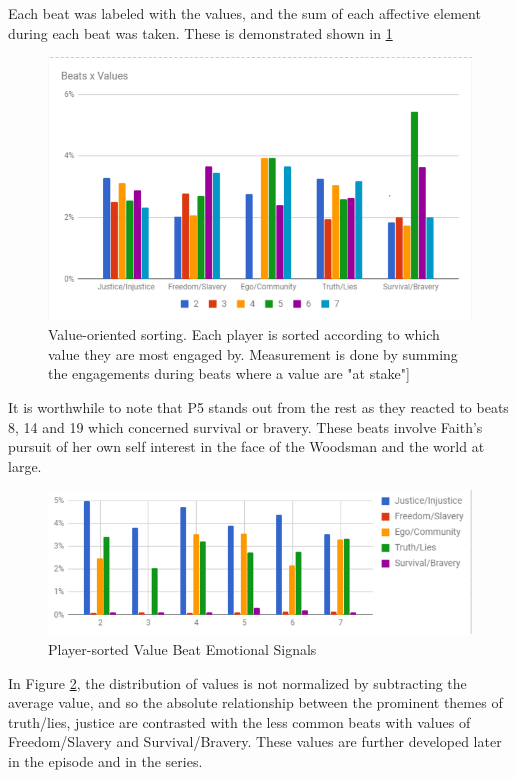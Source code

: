 Each beat was labeled with the values, and the sum of each affective
element during each beat was taken. These is demonstrated shown in
\ref{fig:org6c0ff0b}

\begin{figure}[htbp]
\centering
\includegraphics[width=.9\linewidth]{figures/Fig6PNG.PNG}
\caption{\label{fig:org6c0ff0b}
Value-oriented sorting. Each player is sorted according to which value they are most engaged by. Measurement is done by summing the engagements during beats where a value are "at stake"]}
\end{figure}

It is worthwhile to note that P5 stands out from the rest as they
reacted to beats 8, 14 and 19 which concerned survival or
bravery. These beats involve Faith's pursuit of her own self interest
in the face of the Woodsman and the world at large.

\begin{figure}[htbp]
\centering
\includegraphics[width=.9\linewidth]{figures/fig7.PNG}
\caption{\label{fig:org68ee32d}
Player-sorted Value Beat Emotional Signals}
\end{figure}

In Figure \ref{fig:org68ee32d}, the distribution of values is not
normalized by subtracting the average value, and so the absolute
relationship between the prominent themes of truth/lies, justice are
contrasted with the less common beats with values of Freedom/Slavery
and Survival/Bravery. These values are further developed later in the
episode and in the series.


